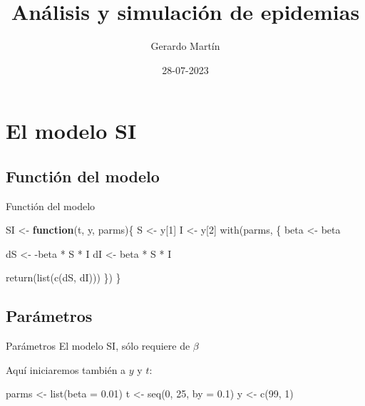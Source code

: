 \documentclass[
  11pt,
  ignorenonframetext,
]{beamer}
\title{Análisis y simulación de epidemias}
\author{Gerardo Martín}
\date{28-07-2023}
\newenvironment{Shaded}{}{}
\newcommand{\AttributeTok}[1]{\textcolor[rgb]{0.49,0.56,0.16}{#1}}
\newcommand{\ControlFlowTok}[1]{\textcolor[rgb]{0.00,0.44,0.13}{\textbf{#1}}}
\newcommand{\DecValTok}[1]{\textcolor[rgb]{0.25,0.63,0.44}{#1}}
\newcommand{\FloatTok}[1]{\textcolor[rgb]{0.25,0.63,0.44}{#1}}
\newcommand{\FunctionTok}[1]{\textcolor[rgb]{0.02,0.16,0.49}{#1}}
\newcommand{\NormalTok}[1]{#1}
\newcommand{\OtherTok}[1]{\textcolor[rgb]{0.00,0.44,0.13}{#1}}
\newcommand{\SpecialCharTok}[1]{\textcolor[rgb]{0.25,0.44,0.63}{#1}}
\begin{document}
\frame{\titlepage}

\hypertarget{el-modelo-si}{%
\section{El modelo SI}\label{el-modelo-si}}

\hypertarget{functiuxf3n-del-modelo}{%
\subsection{Functión del modelo}\label{functiuxf3n-del-modelo}}

\begin{frame}[fragile]{Functión del modelo}
\begin{Shaded}
\begin{Highlighting}[]
\NormalTok{SI }\OtherTok{\textless{}{-}} \ControlFlowTok{function}\NormalTok{(t, y, parms)\{}
\NormalTok{  S }\OtherTok{\textless{}{-}}\NormalTok{ y[}\DecValTok{1}\NormalTok{]}
\NormalTok{  I }\OtherTok{\textless{}{-}}\NormalTok{ y[}\DecValTok{2}\NormalTok{]}
  \FunctionTok{with}\NormalTok{(parms, \{}
\NormalTok{    beta }\OtherTok{\textless{}{-}}\NormalTok{ beta}
    
\NormalTok{    dS }\OtherTok{\textless{}{-}} \SpecialCharTok{{-}}\NormalTok{beta }\SpecialCharTok{*}\NormalTok{ S }\SpecialCharTok{*}\NormalTok{ I}
\NormalTok{    dI }\OtherTok{\textless{}{-}}\NormalTok{ beta }\SpecialCharTok{*}\NormalTok{ S }\SpecialCharTok{*}\NormalTok{ I}
    
    \FunctionTok{return}\NormalTok{(}\FunctionTok{list}\NormalTok{(}\FunctionTok{c}\NormalTok{(dS, dI)))}
\NormalTok{  \})}
\NormalTok{\}}
\end{Highlighting}
\end{Shaded}
\end{frame}

\hypertarget{paruxe1metros}{%
\subsection{Parámetros}\label{paruxe1metros}}

\begin{frame}[fragile]{Parámetros}
El modelo SI, sólo requiere de \(\beta\)

Aquí iniciaremos también a \(y\) y \(t\):

\begin{Shaded}
\begin{Highlighting}[]
\NormalTok{parms }\OtherTok{\textless{}{-}} \FunctionTok{list}\NormalTok{(}\AttributeTok{beta =} \FloatTok{0.01}\NormalTok{)}
\NormalTok{t }\OtherTok{\textless{}{-}} \FunctionTok{seq}\NormalTok{(}\DecValTok{0}\NormalTok{, }\DecValTok{25}\NormalTok{, }\AttributeTok{by =} \FloatTok{0.1}\NormalTok{)}
\NormalTok{y }\OtherTok{\textless{}{-}} \FunctionTok{c}\NormalTok{(}\DecValTok{99}\NormalTok{, }\DecValTok{1}\NormalTok{)}
\end{Highlighting}
\end{Shaded}
\end{frame}
\end{document}
